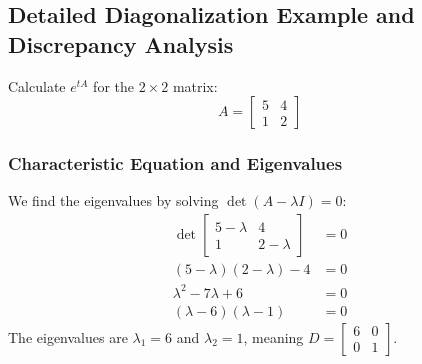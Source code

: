 \documentclass[12pt,a4paper]{report}
\theoremstyle{definition}
\numberwithin{equation}{chapter}
\begin{document}
\subsection{Detailed Diagonalization Example and Discrepancy Analysis}
Calculate $e^{tA}$ for the $2 \times 2$ matrix:
\begin{equation}
A = \begin{bmatrix} 5 & 4 \\ 1 & 2 \end{bmatrix}
\end{equation}

\subsubsection*{Characteristic Equation and Eigenvalues}
We find the eigenvalues by solving $\det(A - \lambda I) = 0$:
\begin{equation}
\begin{aligned}
\det \begin{bmatrix} 5 - \lambda & 4 \\ 1 & 2 - \lambda \end{bmatrix} &= 0 \\
(5-\lambda)(2-\lambda) - 4 &= 0 \\
\lambda^2 - 7\lambda + 6 &= 0 \\
(\lambda-6)(\lambda-1) &= 0
\end{aligned}
\end{equation}
The eigenvalues are $\lambda_1 = 6$ and $\lambda_2 = 1$, meaning $D = \begin{bmatrix} 6 & 0 \\ 0 & 1 \end{bmatrix}$.
\end{document}
